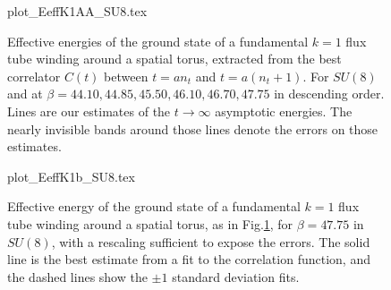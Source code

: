 \documentclass[12pt]{article}
\begin{document}
\clearpage







\begin{figure}[htb]
\begin	{center}
\leavevmode
	{plot_EeffK1AA_SU8.tex}
\end	{center}
\caption{Effective energies of the ground state of a fundamental $k=1$ flux tube winding
  around a spatial torus, extracted from
  the best correlator $C(t)$ between $t=an_t$ and $t=a(n_t+1)$. For $SU(8)$ and at
  $\beta=44.10, 44.85, 45.50, 46.10, 46.70, 47.75$ in descending order. Lines are our estimates of
  the $t\to\infty$ asymptotic energies. The nearly invisible bands around those lines denote the errors
  on those estimates.}
\label{fig_EeffK1_SU8}
\end{figure}



\begin{figure}[htb]
\begin	{center}
\leavevmode
	{plot_EeffK1b_SU8.tex}
\end	{center}
\caption{
  Effective energy of the ground state of a fundamental $k=1$ flux tube winding
  around a spatial torus, as in Fig.\ref{fig_EeffK1_SU8}, for $\beta=47.75$ in $SU(8)$,
  with a rescaling sufficient to expose the errors. The solid line is the best
  estimate from a fit to the correlation function, and the dashed lines show
  the $\pm 1$ standard deviation fits.}
\label{fig_EeffK1b_SU8}
\end{figure}


\end{document}
